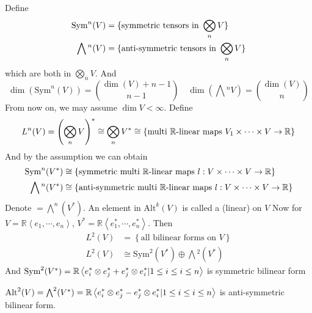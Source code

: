 Define 
\begin{equation}
    \begin{aligned}
        \name{$ \mathrm{Sym}^n(V) $}&=\{\text{symmetric tensors in }\bigotimes_n V\}\\
        \name{$ \bigwedge{}^n(V) $}&=\{\text{anti-symmetric tensors in }\bigotimes_n V\}
    \end{aligned}
\end{equation}
which are both in  $ \bigotimes\limits_nV $. And
\begin{equation}
    \dim (\mathrm{Sym}^n(V))=\binom{\dim(V)+n-1}{n-1}\quad\dim(\bigwedge{}^n  V)=\binom{\dim(V)}{n}
\end{equation}
From now on, we may assume  $ \dim V<\infty $. Define 
\begin{equation}
    \name{$ L^n(V) $}=\left(\bigotimes\limits_n V\right)^*\cong \bigotimes_n V^*\cong \left\{\text{multi  $ \mathbb{R} $-linear maps }V_1\times \cdots\times V\rightarrow \mathbb{R}\right\}
\end{equation} 
And by the assumption we can obtain
\begin{equation}
    \begin{aligned}
        \mathrm{Sym}^n(V^*)&\cong\{\text{symmetric multi  $ \mathbb{R} $-linear maps }l:V\times \cdots \times V\rightarrow \mathbb{R}\}\\
        \bigwedge{}^n(V^*)&\cong \{\text{anti-symmetric multi  $ \mathbb{R} $-linear maps }l:V\times \cdots \times V\rightarrow \mathbb{R}\}
    \end{aligned}
\end{equation}
Denote  $=\bigwedge^n(V^*)  $.  
An element in  $ \mathrm{Alt}^k(V) $ is called a (linear)  on  $ V $ 
Now for  $ V=\mathbb{R}\left<e_1,\cdots,e_n\right> $,  $ V^*=\mathbb{R}\left<e_1^*,\cdots,e_n^*\right> $. Then 
\begin{align*}
    L^2(V)&=\left\{\text{all bilinear forms on }V\right\}\\  
    L^2(V)&\cong \mathrm{Sym}^2(V^*)\oplus \bigwedge{}^2(V^*)
\end{align*}
And  $ \mathrm{Sym}^2(V^*)=\displaystyle\mathbb{R}\left<e_i^*\otimes e_j^*+e_j^*\otimes e_i^*|1 \leq i \leq i \leq n \right> $ is symmetric bilinear form

$ \mathrm{Alt}^2(V)=\bigwedge^2(V^*)=\displaystyle\mathbb{R}\left<e_i^*\otimes e_j^*-e_j^*\otimes e_i^*|1 \leq i \leq i \leq n \right> $ is anti-symmetric bilinear form.

